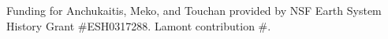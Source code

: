 \documentclass[draft,jgr]{AGUTeX}
\begin{document}
\begin{article}




%
%
%


\begin{acknowledgments}
Funding for Anchukaitis, Meko, and Touchan provided by NSF Earth System History Grant \#ESH0317288. Lamont contribution \#.
\end{acknowledgments}






\end{article}
\end{document}
